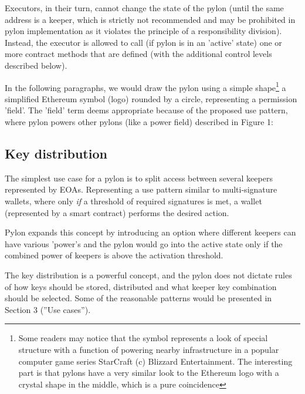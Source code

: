 \documentclass[12pt]{article}
\begin{document}
Executors, in their turn, cannot change the state of the pylon (until the same address is a keeper, which is strictly not recommended and may be prohibited in pylon implementation as it violates the principle of a responsibility division). Instead, the executor is allowed to call (if pylon is in an 'active' state) one or more contract methods that are defined (with the additional control levels described below).

In the following paragraphs, we would draw the pylon using a simple shape\footnote{Some readers may notice that the symbol represents a look of special structure with a function of powering nearby infrastructure in a popular computer game series StarCraft (c) Blizzard Entertainment. The interesting part is that pylons have a very similar look to the Ethereum logo with a crystal shape in the middle, which is a pure coincidence} a simplified Ethereum symbol (logo) rounded by a circle, representing a permission 'field'. The 'field' term deems appropriate because of the proposed use pattern, where pylon powers other pylons (like a power field) described in Figure 1:





\subsection{Key distribution}

The simplest use case for a pylon is to split access between several keepers represented by EOAs. Representing a use pattern similar to multi-signature wallets, where only \emph{if} a threshold of required signatures is met, a wallet (represented by a smart contract) performs the desired action.

Pylon expands this concept by introducing an option where different keepers can have various ’power’s and the pylon would go into the active state only if the combined power of keepers is above the activation threshold.

The key distribution is a powerful concept, and the pylon does not dictate rules of how keys should be stored, distributed and what keeper key combination should be selected. Some of the reasonable patterns would be presented in Section 3 (”Use cases”).
\end{document}
